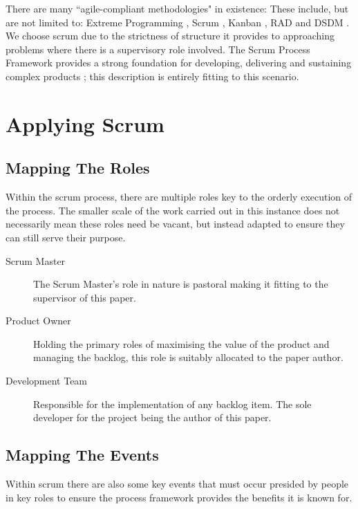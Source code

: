 There are many ``agile-compliant methodologies" in existence: These include, but are not limited to: Extreme Programming \parencite{beck2000extreme}, Scrum \parencite{schwaber2017definitive}, Kanban \parencite{anderson2010kanban}, RAD \parencite{martin1991rapid} and DSDM \parencite{dsdm1995dynamic}. We choose scrum due to the strictness of structure it provides to approaching problems where there is a supervisory role involved. The Scrum Process Framework provides a strong foundation for developing, delivering and sustaining complex products \parencite{schwaber2017definitive}; this description is entirely fitting to this scenario.

\section{Applying Scrum}

\subsection{Mapping The Roles}

Within the scrum process, there are multiple roles key to the orderly execution of the process. The smaller scale of the work carried out in this instance does not necessarily mean these roles need be vacant, but instead adapted to ensure they can still serve their purpose.

\begin{description}
	\item[Scrum Master] The Scrum Master's role in nature is pastoral making it fitting to the supervisor of this paper.
	
	\item[Product Owner] Holding the primary roles of maximising the value of the product and managing the backlog, this role is suitably allocated to the paper author.
	
	\item[Development Team] Responsible for the implementation of any backlog item. The sole developer for the project being the author of this paper.
\end{description}

\newpage
\subsection{Mapping The Events}

Within scrum there are also some key events that must occur presided by people in key roles to ensure the process framework provides the benefits it is known for.

